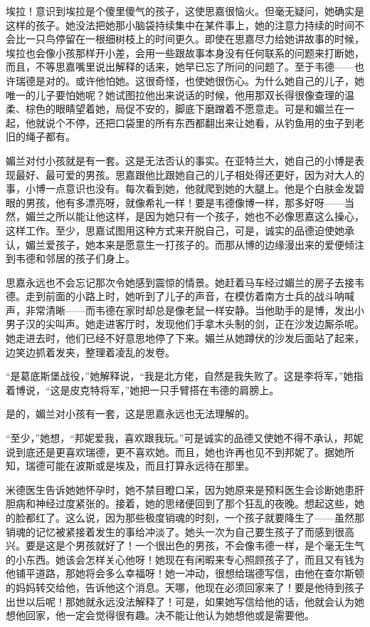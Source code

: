 \par 埃拉！意识到埃拉是个傻里傻气的孩子，这使思嘉很恼火。但毫无疑问，她确实是这样的孩子。她没法把她那小脑袋持续集中在某件事上，她的注意力持续的时间不会比一只鸟停留在一根细树枝上的时间更久。即使在思嘉尽力给她讲故事的时候，埃拉也会像小孩那样开小差，会用一些跟故事本身没有任何联系的问题来打断她，而且，不等思嘉嘴里说出解释的话来，她早已忘了所问的问题了。至于韦德——也许瑞德是对的。或许他怕她。这很奇怪，也使她很伤心。为什么她自己的儿子，她唯一的儿子要怕她呢？她试图拉他出来说话的时候，他用那双长得很像查理的温柔、棕色的眼睛望着她，局促不安的，脚底下磨蹭着不愿意走。可是和媚兰在一起，他就说个不停，还把口袋里的所有东西都翻出来让她看，从钓鱼用的虫子到老旧的绳子都有。
\par 媚兰对付小孩就是有一套。这是无法否认的事实。在亚特兰大，她自己的小博是表现最好、最可爱的男孩。思嘉跟他比跟她自己的儿子相处得还更好，因为对大人的事，小博一点意识也没有。每次看到她，他就爬到她的大腿上。他是个白肤金发碧眼的男孩，他有多漂亮呀，就像希礼一样！要是韦德像博一样，那多好呀——当然，媚兰之所以能让他这样，是因为她只有一个孩子，她也不必像思嘉这么操心，这样工作。至少，思嘉试图用这种方式来开脱自己，可是，诚实的品德迫使她承认，媚兰爱孩子，她本来是愿意生一打孩子的。而那从博的边缘漫出来的爱便倾注到韦德和邻居的孩子们身上。
\par 思嘉永远也不会忘记那次令她感到震惊的情景。她赶着马车经过媚兰的房子去接韦德。走到前面的小路上时，她听到了儿子的声音，在模仿着南方士兵的战斗呐喊声，非常清晰——而韦德在家时却总是像老鼠一样安静。当他助手的是博，发出小男子汉的尖叫声。她走进客厅时，发现他们手拿木头制的剑，正在沙发边厮杀呢。她走进去时，他们已经不好意思地停了下来。媚兰从她蹲伏的沙发后面站了起来，边笑边抓着发夹，整理着凌乱的发卷。
\par “是葛底斯堡战役，”她解释说，“我是北方佬，自然是我失败了。这是李将军，”她指着博说，“这是皮克特将军，”她把一只手臂搭在韦德的肩膀上。
\par 是的，媚兰对小孩有一套，这是思嘉永远也无法理解的。
\par “至少，”她想，“邦妮爱我，喜欢跟我玩。”可是诚实的品德又使她不得不承认，邦妮说到底还是更喜欢瑞德，更不喜欢她。而且，她也许再也见不到邦妮了。据她所知，瑞德可能在波斯或是埃及，而且打算永远待在那里。
\par 米德医生告诉她她怀孕时，她不禁目瞪口呆，因为她原来是预料医生会诊断她患肝胆病和神经过度紧张的。接着，她的思绪便回到了那个狂乱的夜晚。想起这些，她的脸都红了。这么说，因为那些极度销魂的时刻，一个孩子就要降生了——虽然那销魂的记忆被紧接着发生的事给冲淡了。她头一次为自己要生孩子了而感到很高兴。要是这是个男孩就好了！一个很出色的男孩，不会像韦德一样，是个毫无生气的小东西。她该会怎样关心他呀！她现在有闲暇来专心照顾孩子了，而且又有钱为他铺平道路，那她将会多么幸福呀！她一冲动，很想给瑞德写信，由他在查尔斯顿的妈妈转交给他，告诉他这个消息。天哪，他现在必须回家来了！要是他待到孩子出世以后呢！那她就永远没法解释了！可是，如果她写信给他的话，他就会认为她想他回家，他一定会觉得很有趣。决不能让他认为她想他或是需要他。
